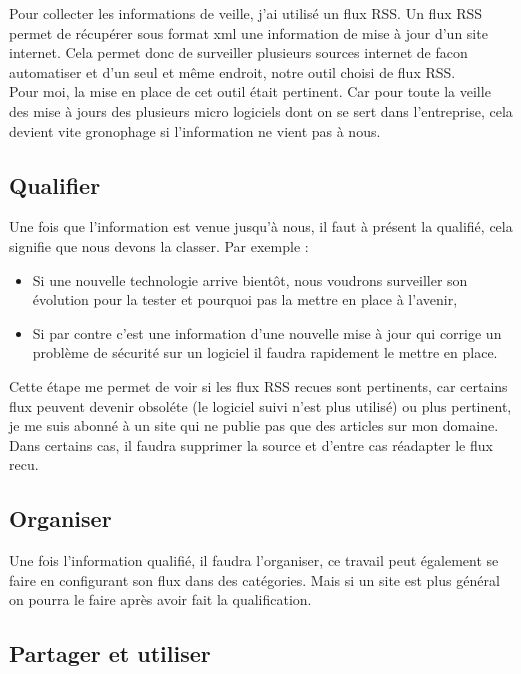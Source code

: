 \documentclass[11pt,a4paper,oneside]{book}
\begin{document}
Pour collecter les informations de veille, j'ai utilisé un flux RSS.
Un flux RSS permet de récupérer sous format xml une information de mise à jour d'un site internet. Cela permet donc de surveiller plusieurs sources internet de facon automatiser et d'un seul et même endroit, notre outil choisi de flux RSS. \\
Pour moi, la mise en place de cet outil était pertinent. Car pour toute la veille des mise à jours des plusieurs micro logiciels dont on se sert dans l'entreprise, cela devient vite gronophage si l'information ne vient pas à nous.

\subsection{Qualifier}

Une fois que l'information est venue jusqu'à nous, il faut à présent la qualifié, cela signifie que nous devons la classer.
Par exemple :
\begin{itemize}
\item Si une nouvelle technologie arrive bientôt, nous voudrons surveiller son évolution pour la tester et pourquoi pas la mettre en place à l'avenir,
\item Si par contre c'est une information d'une nouvelle mise à jour qui corrige un problème de  sécurité sur un logiciel il faudra rapidement le mettre en place.
\end{itemize}
Cette étape me permet de voir si les flux RSS recues sont pertinents, car certains flux peuvent devenir obsoléte (le logiciel suivi n'est plus utilisé) ou plus pertinent, je me suis abonné à un site qui ne publie pas que des articles sur mon domaine. \\
Dans certains cas, il faudra supprimer la source et d'entre cas réadapter le flux recu.

\subsection{Organiser}

Une fois l'information qualifié, il faudra l'organiser, ce travail peut également se faire en configurant son flux dans des catégories. Mais si un site est plus général on pourra le faire après avoir fait la qualification.

\subsection{Partager et utiliser}
\end{document}
